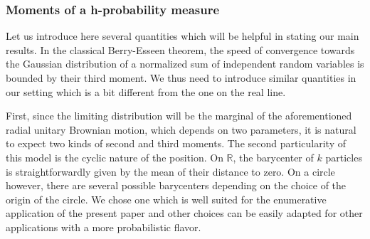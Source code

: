 \documentclass[10pt,11pt]{amsart}%
\begin{document}
\subsubsection{Moments of a h-probability measure} Let us introduce here several quantities which will be helpful in stating our main results. In the classical Berry-Esseen theorem, the speed of convergence towards the Gaussian distribution of a normalized sum of independent random variables is bounded by their third moment. We thus need to introduce similar quantities in our setting which is a bit different from the one on the real line. 

First, since the limiting distribution will be the marginal of the aforementioned radial unitary Brownian motion, which depends on two parameters, it is natural to expect two kinds of second and third moments. The second particularity of this model is the cyclic nature of the position. On $\mathbb{R}$, the barycenter of $k$ particles is straightforwardly given by the mean of their distance to zero. On a circle however, there are several possible barycenters depending on the choice of the origin of the circle. We chose one which is well suited for the enumerative application of the present paper and other choices can be easily adapted for other applications with a more probabilistic flavor.
\end{document}
